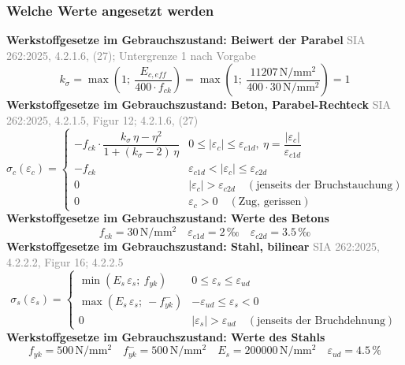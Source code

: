 \documentclass[11pt,a4paper]{article}
\newcommand{\normref}[1]{{\small\textcolor{gray}{#1}}}
\begin{document}
\subsubsection{Welche Werte angesetzt werden}
\noindent\textbf{Werkstoffgesetze im Gebrauchszustand: Beiwert der Parabel} \hfill \normref{SIA 262:2025, 4.2.1.6, (27); Untergrenze 1 nach Vorgabe}
\begin{equation*}
k_{\sigma} = \max\left(1;\ \frac{E_{c,eff}}{400 \cdot f_{ck}}\right) = \max\left(1;\ \frac{11207\,\mathrm{N}/\mathrm{mm}^{2}}{400 \cdot 30\,\mathrm{N}/\mathrm{mm}^{2}}\right) = 1
\end{equation*}
\noindent\textbf{Werkstoffgesetze im Gebrauchszustand: Beton, Parabel-Rechteck} \hfill \normref{SIA 262:2025, 4.2.1.5, Figur 12; 4.2.1.6, (27)}
\begin{equation*}
\sigma_c(\varepsilon_c) = \begin{cases} -f_{ck} \cdot \dfrac{k_\sigma\,\eta - \eta^2}{1 + (k_\sigma - 2)\,\eta} & 0 \le |\varepsilon_c| \le \varepsilon_{c1d},\ \eta = \dfrac{|\varepsilon_c|}{\varepsilon_{c1d}} \\[2ex] -f_{ck} & \varepsilon_{c1d} < |\varepsilon_c| \le \varepsilon_{c2d} \\[1ex] 0 & |\varepsilon_c| > \varepsilon_{c2d} \quad (\text{jenseits der Bruchstauchung}) \\[1ex] 0 & \varepsilon_c > 0 \quad (\text{Zug, gerissen}) \end{cases}
\end{equation*}
\noindent\textbf{Werkstoffgesetze im Gebrauchszustand: Werte des Betons}
\begin{equation*}
f_{ck} = 30\,\mathrm{N}/\mathrm{mm}^{2} \quad \varepsilon_{c1d} = 2\,\text{‰} \quad \varepsilon_{c2d} = 3.5\,\text{‰}
\end{equation*}
\noindent\textbf{Werkstoffgesetze im Gebrauchszustand: Stahl, bilinear} \hfill \normref{SIA 262:2025, 4.2.2.2, Figur 16; 4.2.2.5}
\begin{equation*}
\sigma_s(\varepsilon_s) = \begin{cases} \min(E_s\,\varepsilon_s;\ f_{yk}) & 0 \le \varepsilon_s \le \varepsilon_{ud} \\[1ex] \max(E_s\,\varepsilon_s;\ -f_{yk}^{-}) & -\varepsilon_{ud} \le \varepsilon_s < 0 \\[1ex] 0 & |\varepsilon_s| > \varepsilon_{ud} \quad (\text{jenseits der Bruchdehnung}) \end{cases}
\end{equation*}
\noindent\textbf{Werkstoffgesetze im Gebrauchszustand: Werte des Stahls}
\begin{equation*}
f_{yk} = 500\,\mathrm{N}/\mathrm{mm}^{2} \quad f_{yk}^{-} = 500\,\mathrm{N}/\mathrm{mm}^{2} \quad E_s = 200000\,\mathrm{N}/\mathrm{mm}^{2} \quad \varepsilon_{ud} = 4.5\,\%
\end{equation*}
\end{document}
